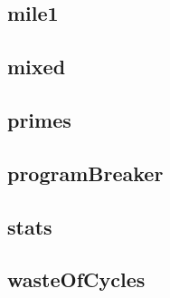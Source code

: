 \newpage
\subsection{mile1}
    \begin{figure}[h]
	    \centering
		
	\end{figure}
    


\newpage
\subsection{mixed}
    \begin{figure}[h]
	    \centering
		
	\end{figure}
    


\newpage
\subsection{primes}
    \begin{figure}[h]
	    \centering
		
	\end{figure}
    


\newpage
\subsection{programBreaker}
    \begin{figure}[h]
	    \centering
		
	\end{figure}
    


\newpage
\subsection{stats}
    \begin{figure}[h]
	    \centering
		
	\end{figure}
    


\newpage
\subsection{wasteOfCycles}
    \begin{figure}[h]
	    \centering
		
	\end{figure}
    

